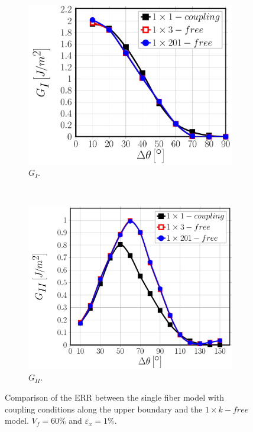 \documentclass[review]{elsarticle}
\begin{document}
\begin{figure}[!h]
\centering
    \begin{subfigure}[b]{0.475\textwidth}
        \includegraphics[width=\textwidth]{comparecouplingabovesidefibers-vf60-GI.pdf}
        \caption{$G_{I}$.}\label{subfig:comparisoncoupling60MI}
    \end{subfigure} ~
   \begin{subfigure}[b]{0.475\textwidth}
        \includegraphics[width=\textwidth]{comparecouplingabovesidefibers-vf60-GII.pdf}
        \caption{$G_{II}$.}\label{subfig:comparisoncoupling60MII}
    \end{subfigure}

\caption{Comparison of the ERR between the single fiber model with coupling conditions along the upper boundary and the $1\times k-free$ model. $V_{f}=60\%$ and $\varepsilon_{x}=1\%$.}\label{fig:comparisoncoupling}
\end{figure}
\end{document}
